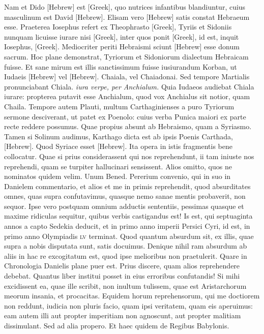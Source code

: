 Nam et Dido \texthebrew{[Hebrew]} est \textgreek{[Greek]},
 quo nutrices
infantibus blandiuntur, cuius masculinum est David \texthebrew{[Hebrew]}.
Elisam
vero \texthebrew{[Hebrew]} satis constat Hebraeum esse.
Praeterea Iosephus refert
ex Theophrasto \textgreek{[Greek]}, Tyriis et Sidoniis nunquam licuisse
iurare nisi \textgreek{[Greek]},
 inter quos ponit \textgreek{[Greek]}, id est, inquit
Iosephus, \textgreek{[Greek]}.
Mediocriter periti Hebraismi sciunt \texthebrew{[Hebrew]} esse
donum sacrum.
Hoc plane demonstrat, Tyriorum et Sidoniorum
dialectum Hebraicam fuisse.
Et sane mirum est illis sanctissimum
fuisse iusiurandum Korban, ut Iudaeis
 \texthebrew{[Hebrew]} vel \texthebrew{[Hebrew]}.
Chaiala,
vel Chaiadonai.
Sed tempore Martialis pronunciabant Chiala.
\textit{iura verpe, per Anchialum.}
Quia Iudaeos audiebat Chiala iurare:
propterea putavit esse Anchialum, quod vox Anchialus sit notior,
quam Chaila.
Tempore autem Plauti, multum Carthaginienses
a puro Tyriorum sermone desciverant, ut patet ex Poenolo:
cuius verba Punica maiori ex parte recte reddere possumus.
Quae propius absunt ab Hebraismo, quam a Syriasmo.
Tamen
si Solinum audimus, Karthago dicta est ab ipsis Poenis Carthada,
\texthebrew{[Hebrew]}.
Quod Syriace esset \texthebrew{[Hebrew]}.
Ita opera in istis fragmentis
bene collocatur.
Quae si prius considerassent qui nos reprehendunt,
ii tam iniuste nos reprehendi, quam se turpiter hallucinari
sensissent.
Alios omitto, quos ne nominatos quidem velim.
Unum Bened.
Pererium convenio, qui in suo in Danielem commentario,
et alios et me in primis reprehendit, quod absurditates
omnes, quas supra confutavimus, quasque nemo sanae mentis
probaverit, non sequor.
Ipse vero postquam omnium adductis sententiis,
pessimas quasque et maxime ridiculas sequitur, quibus verbis
castigandus est!
Is est, qui septuaginta annos a capto Sedekia
deducit, et in primo anno imperii Persici Cyri, id est, in primo
anno Olympiadis \textsc{lv} terminat.
Quod quantum absurdum sit, ex
illis, quae supra a nobis disputata sunt, satis docuimus.
Denique
nihil ram absurdum ab aliis in hac re excogitatum est, quod ipse
melioribus non praetulerit.
Quare in Chronologia Danielis plane
puer est.
Prius discere, quam alios reprehendere debebat.
Quantus liber institui posset in eius erroribus confutandis!
Si mihi excidissent
ea, quae ille scribit, non inultum tulissem, quae est Aristarchorum
meorum insania, et procacitas.
Equidem horum reprehensorum,
qui me doctiorem non reddunt, iudicia non pluris
facio, quam ipsi veritatem, quam eis aperuimus: eam autem illi aut
propter imperitiam non agnoscunt, aut propter malitiam dissimulant.
Sed ad alia propero.
Et haec quidem de Regibus Babylonis.
{}

